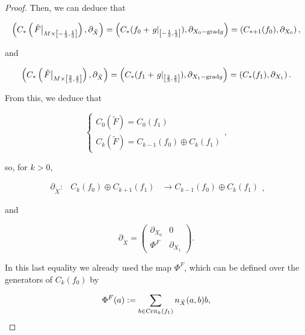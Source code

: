 \begin{proof}
Then, we can deduce that

\begin{displaymath}
\left(C_{\ast}\left(\left.\tilde{F}\right|_{M\times \left[-\frac13,\frac13\right]}\right), \partial_{\tilde{X}}\right) =
\left(C_{\ast}(f_0+\left.g\right|_{\left[-\frac13,\frac13\right]}), \partial_{X_0 - \text{grad} g}\right) =
\left(C_{\ast + 1}(f_0), \partial_{X_0}\right) ,
\end{displaymath}

and

\begin{displaymath}
\left(C_{\ast}\left(\left.\tilde{F}\right|_{M\times \left[\frac23,\frac43\right]}\right), \partial_{\tilde{X}}\right) =
\left(C_{\ast}(f_1+\left.g\right|_{\left[\frac23,\frac43\right]}), \partial_{X_1 - \text{grad} g}\right) =
\left(C_{\ast}(f_1), \partial_{X_1}\right) .
\end{displaymath}

From this, we deduce that

\begin{displaymath}
\left\{ \begin{array}{l} C_0(\tilde{F}) = C_0(f_1) \\ C_k(\tilde{F}) = C_{k-1}(f_0) \oplus C_k(f_1) \end{array} \right. ,
\end{displaymath}

so, for $k > 0$,

\begin{displaymath}
\begin{array}{rccc} \partial_{\tilde{X}} : & C_k(f_0) \oplus C_{k+1}(f_1) & \longrightarrow C_{k-1}(f_0) \oplus C_k(f_1) \end{array} ,
\end{displaymath}

and

\begin{displaymath}
\partial_{\tilde{X}} =
\begin{pmatrix}
\partial_{X_0} & 0 \\
\Phi^F & \partial_{X_1}
\end{pmatrix} .
\end{displaymath}

In this last equality we already used the map $\Phi^F$, which can be defined over the generators of $C_k(f_0)$ by

\begin{equation}\label{defmorphism}
\Phi^F(a) := \sum_{b \in \text{Crit}_k(f_1)} n_{\tilde{X}}(a,b) b ,
\end{equation}


\end{proof}

